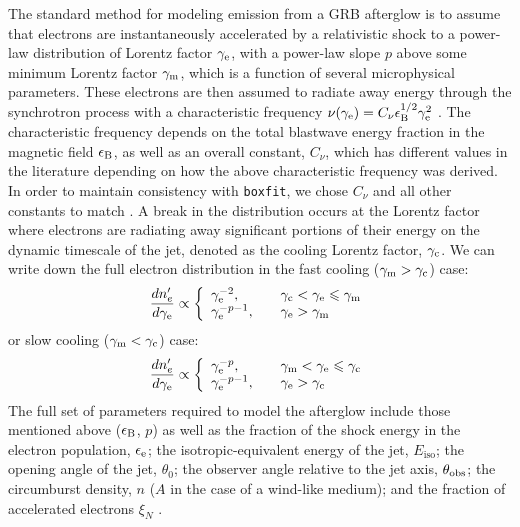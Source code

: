 \documentclass[fleqn,usenatbib]{mnras}
\begin{document}
The standard method for modeling emission from a GRB afterglow is to assume that electrons are instantaneously accelerated by a relativistic shock to a power-law distribution of Lorentz factor $\gamma_{\rm e}$, with a power-law slope $p$ above some minimum Lorentz factor $\gamma_{\rm m}$, which is a function of several microphysical parameters. These electrons are then assumed to radiate away energy through the synchrotron process with a characteristic frequency $\nu(\gamma_{\rm e}) = C_\nu \epsilon_{\rm B}^{1/2}\gamma_{\rm e}^2$ \citep{AG1, WG99}. The characteristic frequency depends on the total blastwave energy fraction in the magnetic field $\epsilon_{\rm B}$, as well as an overall constant, $C_\nu$, which has different values in the literature depending on how the above characteristic frequency was derived. In order to maintain consistency with \texttt{boxfit}, we chose $C_\nu$ and all other constants to match \citet{ve11}. A break in the distribution occurs at the Lorentz factor where electrons are radiating away significant portions of their energy on the dynamic timescale of the jet, denoted as the cooling Lorentz factor, $\gamma_{\rm c}$. We can write down the full electron distribution in the fast cooling ($\gamma_{\rm m} > \gamma_{\rm c}$) case:
\begin{equation}
\frac{dn_e^{\prime}}{d\gamma_{\rm e}} \propto \left\{
        \begin{array}{ll}
            \gamma_{\rm e}^{-2}, & \quad \gamma_{\rm c} < \gamma_{\rm e} \leq \gamma_{\rm m} \\
            \gamma_{\rm e}^
            {-p-1}, & \quad \gamma_{\rm e} > \gamma_{\rm m}
        \end{array}
    \right.
\end{equation}
or slow cooling ($\gamma_{\rm m} < \gamma_{\rm c}$) case:
\begin{equation}
\frac{dn_e^{\prime}}{d\gamma_{\rm e}} \propto \left\{
        \begin{array}{ll}
            \gamma_{\rm e}^{-p}, & \quad \gamma_{\rm m} < \gamma_{\rm e} \leq \gamma_{\rm c} \\
            \gamma_{\rm e}^
            {-p-1}, & \quad \gamma_{\rm e} > \gamma_{\rm c}
        \end{array}
    \right.
\end{equation}
The full set of parameters required to model the afterglow include those mentioned above ($\epsilon_{\rm B}$, $p$) as well as the fraction of the shock energy in the electron population, $\epsilon_{\rm e}$; the isotropic-equivalent energy of the jet, $E_{\text{iso}}$; the opening angle of the jet, $\theta_0$; the observer angle relative to the jet axis, $\theta_{\rm obs}$; the circumburst density, $n$ ($A$ in the case of a wind-like medium); and the fraction of accelerated electrons $\xi_N$ \citep{AG1, WG99, CL99}.
\end{document}
